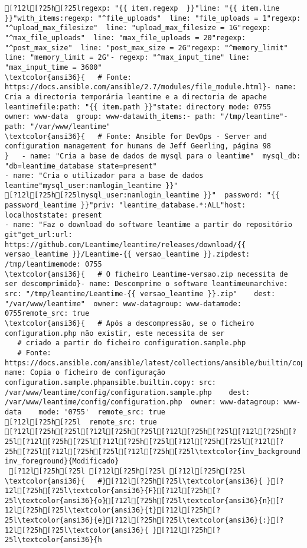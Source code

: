 \documentclass{scrartcl}
\begin{document}
\begin{Verbatim}
[?12l[?25h[?25lregexp: "{{ item.regexp  }}"line: "{{ item.line }}"with_items:regexp: "^file_uploads"  line: "file_uploads = 1"regexp: "^upload_max_filesize"  line: "upload_max_filesize = 1G"regexp: "^max_file_uploads"  line: "max_file_uploads = 20"regexp: "^post_max_size"  line: "post_max_size = 2G"regexp: "^memory_limit"  line: "memory_limit = 2G"- regexp: "^max_input_time" line: "max_input_time = 3600"
\textcolor{ansi36}{   # Fonte: https://docs.ansible.com/ansible/2.7/modules/file_module.html}- name: Cria a directoria temporária leantime e a directoria de apache leantimefile:path: "{{ item.path }}"state: directory mode: 0755    owner: www-data  group: www-datawith_items:- path: "/tmp/leantime"- path: "/var/www/leantime"
\textcolor{ansi36}{   # Fonte: Ansible for DevOps - Server and configuration management for humans de Jeff Geerling, página 98
}   - name: "Cria a base de dados de mysql para o leantime"  mysql_db: "db=leantime_database state=present"
- name: "Cria o utilizador para a base de dados leantime"mysql_user:namlogin_leantime }}"
[?12l[?25h[?25lmysql_user:namlogin_leantime }}"  password: "{{ password_leantime }}"priv: "leantime_database.*:ALL"host: localhoststate: present
- name: "Faz o download do software leantime a partir do repositório git"get_url:url: https://github.com/Leantime/leantime/releases/download/{{ versao_leantime }}/Leantime-{{ versao_leantime }}.zipdest: /tmp/leantimemode: 0755
\textcolor{ansi36}{   # O ficheiro Leantime-versao.zip necessita de ser descomprimido}- name: Descomprime o software leantimeunarchive: src: "/tmp/leantime/Leantime-{{ versao_leantime }}.zip"    dest: "/var/www/leantime"  owner: www-datagroup: www-datamode: 0755remote_src: true
\textcolor{ansi36}{   # Após a descompressão, se o ficheiro configuration.php não existir, este necessita de ser
   # criado a partir do ficheiro configuration.sample.php
   # Fonte: https://docs.ansible.com/ansible/latest/collections/ansible/builtin/copy_module.html}- name: Copia o ficheiro de configuração configuration.sample.phpansible.builtin.copy: src: /var/www/leantime/config/configuration.sample.php    dest: /var/www/leantime/config/configuration.php  owner: www-datagroup: www-data    mode: '0755'  remote_src: true
[?12l[?25h[?25l  remote_src: true
[?12l[?25h[?25l[?12l[?25h[?25l[?12l[?25h[?25l[?12l[?25h[?25l[?12l[?25h[?25l[?12l[?25h[?25l[?12l[?25h[?25l[?12l[?25h[?25l[?12l[?25h[?25l[?12l[?25h[?25l\textcolor{inv_background inv_foreground}{Modificado}
 [?12l[?25h[?25l [?12l[?25h[?25l [?12l[?25h[?25l
\textcolor{ansi36}{   #}[?12l[?25h[?25l\textcolor{ansi36}{ }[?12l[?25h[?25l\textcolor{ansi36}{F}[?12l[?25h[?25l\textcolor{ansi36}{o}[?12l[?25h[?25l\textcolor{ansi36}{n}[?12l[?25h[?25l\textcolor{ansi36}{t}[?12l[?25h[?25l\textcolor{ansi36}{e}[?12l[?25h[?25l\textcolor{ansi36}{:}[?12l[?25h[?25l\textcolor{ansi36}{ }[?12l[?25h[?25l\textcolor{ansi36}{h

\end{Verbatim}
\end{document}

